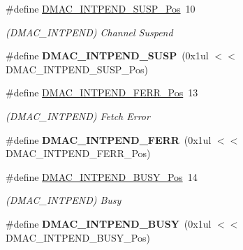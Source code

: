 \begin{DoxyCompactItemize}
\item 
\hypertarget{group___s_a_m_l21___d_m_a_c_ga67bf2a8b574745862b97b720b8e58c80}{}\#define \hyperlink{group___s_a_m_l21___d_m_a_c_ga67bf2a8b574745862b97b720b8e58c80}{D\+M\+A\+C\+\_\+\+I\+N\+T\+P\+E\+N\+D\+\_\+\+S\+U\+S\+P\+\_\+\+Pos}~10\label{group___s_a_m_l21___d_m_a_c_ga67bf2a8b574745862b97b720b8e58c80}

\begin{DoxyCompactList}\small\item\em (D\+M\+A\+C\+\_\+\+I\+N\+T\+P\+E\+N\+D) Channel Suspend \end{DoxyCompactList}\item 
\hypertarget{group___s_a_m_l21___d_m_a_c_ga45a14913e8a3ec64ec1a09145ef835ea}{}\#define {\bfseries D\+M\+A\+C\+\_\+\+I\+N\+T\+P\+E\+N\+D\+\_\+\+S\+U\+S\+P}~(0x1ul $<$$<$ D\+M\+A\+C\+\_\+\+I\+N\+T\+P\+E\+N\+D\+\_\+\+S\+U\+S\+P\+\_\+\+Pos)\label{group___s_a_m_l21___d_m_a_c_ga45a14913e8a3ec64ec1a09145ef835ea}

\item 
\hypertarget{group___s_a_m_l21___d_m_a_c_ga5f26465154bafce0bc200b342e2a7ac3}{}\#define \hyperlink{group___s_a_m_l21___d_m_a_c_ga5f26465154bafce0bc200b342e2a7ac3}{D\+M\+A\+C\+\_\+\+I\+N\+T\+P\+E\+N\+D\+\_\+\+F\+E\+R\+R\+\_\+\+Pos}~13\label{group___s_a_m_l21___d_m_a_c_ga5f26465154bafce0bc200b342e2a7ac3}

\begin{DoxyCompactList}\small\item\em (D\+M\+A\+C\+\_\+\+I\+N\+T\+P\+E\+N\+D) Fetch Error \end{DoxyCompactList}\item 
\hypertarget{group___s_a_m_l21___d_m_a_c_ga33be0049c04ffd8f75a9affd2d3b5b12}{}\#define {\bfseries D\+M\+A\+C\+\_\+\+I\+N\+T\+P\+E\+N\+D\+\_\+\+F\+E\+R\+R}~(0x1ul $<$$<$ D\+M\+A\+C\+\_\+\+I\+N\+T\+P\+E\+N\+D\+\_\+\+F\+E\+R\+R\+\_\+\+Pos)\label{group___s_a_m_l21___d_m_a_c_ga33be0049c04ffd8f75a9affd2d3b5b12}

\item 
\hypertarget{group___s_a_m_l21___d_m_a_c_ga23c0fb4c2c4f6ba876ece35fdb20db8b}{}\#define \hyperlink{group___s_a_m_l21___d_m_a_c_ga23c0fb4c2c4f6ba876ece35fdb20db8b}{D\+M\+A\+C\+\_\+\+I\+N\+T\+P\+E\+N\+D\+\_\+\+B\+U\+S\+Y\+\_\+\+Pos}~14\label{group___s_a_m_l21___d_m_a_c_ga23c0fb4c2c4f6ba876ece35fdb20db8b}

\begin{DoxyCompactList}\small\item\em (D\+M\+A\+C\+\_\+\+I\+N\+T\+P\+E\+N\+D) Busy \end{DoxyCompactList}\item 
\hypertarget{group___s_a_m_l21___d_m_a_c_ga244d56ccf1d53bdd5056c0598cbf1f60}{}\#define {\bfseries D\+M\+A\+C\+\_\+\+I\+N\+T\+P\+E\+N\+D\+\_\+\+B\+U\+S\+Y}~(0x1ul $<$$<$ D\+M\+A\+C\+\_\+\+I\+N\+T\+P\+E\+N\+D\+\_\+\+B\+U\+S\+Y\+\_\+\+Pos)\label{group___s_a_m_l21___d_m_a_c_ga244d56ccf1d53bdd5056c0598cbf1f60}


\end{DoxyCompactItemize}
